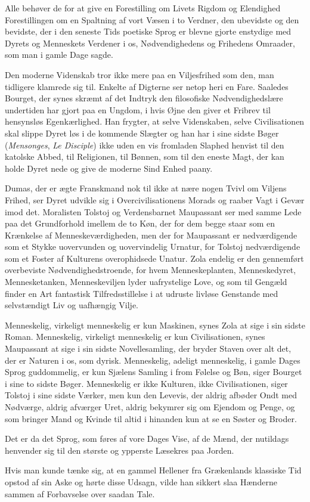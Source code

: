 \documentclass[12pt,a4paper]{article}
\begin{document}
Alle behøver de for at give en Forestilling om Livets Rigdom og
Elendighed Forestillingen om en Spaltning af vort Væsen i to Verdner, den
ubevidste og den bevidste, der i den seneste Tids poetiske Sprog er blevne
gjorte enstydige med Dyrets og Menneskets Verdener i os,
Nødvendighedens og Frihedens Omraader, som man i gamle Dage sagde.

Den moderne Videnskab tror ikke mere paa en Viljesfrihed som den, man
tidligere klamrede sig til. Enkelte af Digterne ser netop heri en Fare.
Saaledes Bourget, der synes skræmt af det Indtryk den filosofiske
Nødvendighedslære undertiden har gjort paa en Ungdom, i hvis Øjne den
giver et Fribrev til hensynsløs Egenkærlighed. Han frygter, at selve
Videnskaben, selve Civilisationen skal slippe Dyret løs i de kommende
Slægter og han har i sine sidste Bøger (\textit{Mensonges}, \textit{Le
Disciple}) ikke uden en vis fromladen Slaphed henvist til den katolske
Abbed, til Religionen, til Bønnen, som til den eneste Magt, der kan holde
Dyret nede og give de moderne Sind Enhed paany.

Dumas, der er ægte Franskmand nok til ikke at nære nogen Tvivl om Viljens
Frihed, ser Dyret udvikle sig i Overcivilisationens Morads og raaber Vagt
i Gevær imod det. Moralisten Tolstoj og Verdensbarnet Maupassant ser med
samme Lede paa det Grundforhold imellem de to Køn, der for dem begge
staar som en Krænkelse af Menneskeværdigheden, men der for Maupassant er
nedværdigende som et Stykke uovervunden og uovervindelig Urnatur, for
Tolstoj nedværdigende som et Foster af Kulturens overophidsede Unatur.
Zola endelig er den gennemført overbeviste Nødvendighedstroende, for hvem
Menneskeplanten, Menneskedyret, Mennesketanken, Menneskeviljen lyder
uafrystelige Love, og som til Gengæld finder en Art fantastisk
Tilfredsstillelse i at udruste livløse Genstande med selvstændigt Liv og
uafhængig Vilje.

Menneskelig, virkeligt menneskelig er kun Maskinen, synes Zola at sige i
sin sidste Roman. Menneskelig, virkeligt menneskelig er kun Civilisationen,
synes Maupassant at sige i sin sidste Novellesamling, der bryder Staven
over alt det, der er Naturen i os, som dyrisk. Menneskelig, adeligt
menneskelig, i gamle Dages Sprog guddommelig, er kun Sjælens Samling i
from Følelse og Bøn, siger Bourget i sine to sidste Bøger. Menneskelig er
ikke Kulturen, ikke Civilisationen, siger Tolstoj i sine sidste Værker,
men kun den Levevis, der aldrig afbøder Ondt med Nødværge, aldrig
afværger Uret, aldrig bekymrer sig om Ejendom og Penge, og som bringer
Mand og Kvinde til altid i hinanden kun at se en Søster og Broder.

Det er da det Sprog, som føres af vore Dages Vise, af de Mænd, der
nutildags henvender sig til den største og ypperste Læsekres paa Jorden.

Hvis man kunde tænke sig, at en gammel Hellener fra Grækenlands klassiske
Tid opstod af sin Aske og hørte disse Udsagn, vilde han sikkert slaa
Hænderne sammen af Forbavselse over saadan Tale.
\end{document}
